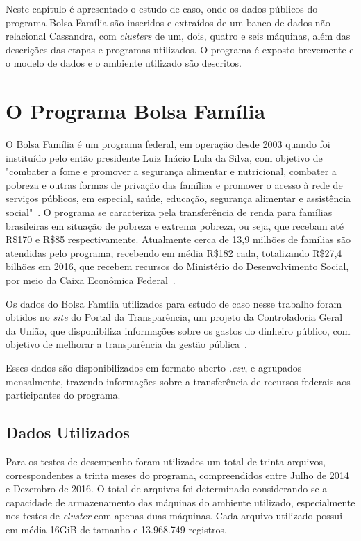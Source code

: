 Neste capítulo é apresentado o estudo de caso, onde os dados públicos do programa Bolsa Família são inseridos e extraídos de um banco de dados não relacional Cassandra, com \emph{clusters} de um, dois, quatro e seis máquinas, além das descrições das etapas e programas utilizados. O programa é exposto brevemente e o modelo de dados e o ambiente utilizado são descritos.

\section{O Programa Bolsa Família}
O Bolsa Família é um programa federal, em operação desde 2003 quando foi instituído pelo então presidente Luiz Inácio Lula da Silva, com objetivo de "combater a fome e promover a segurança alimentar e nutricional, combater a pobreza e outras formas de privação das famílias e promover o acesso à rede de serviços públicos, em especial, saúde, educação, segurança alimentar e assistência social"~\cite{caixa-bolsafamilia}. 
O programa se caracteriza pela transferência de renda para famílias brasileiras em situação de pobreza e extrema pobreza, ou seja, que recebam até R\$170 e R\$85 respectivamente. Atualmente cerca de 13,9 milhões de famílias são atendidas pelo programa, recebendo em média R\$182 cada, totalizando R\$27,4 bilhões em 2016, que recebem recursos do Ministério do Desenvolvimento Social, por meio da Caixa Econômica Federal~\cite{gov-bolsafamilia1, gov-bolsafamilia2}.

Os dados do Bolsa Família utilizados para estudo de caso nesse trabalho foram obtidos no \emph{site} do Portal da Transparência, um projeto da Controladoria Geral da União, que disponibiliza informações sobre os gastos do dinheiro público, com objetivo de melhorar a transparência da gestão pública~\cite{sobreportaldatransparencia}. 

Esses dados são disponibilizados em formato aberto \emph{.csv}, e agrupados mensalmente, trazendo informações sobre a transferência de recursos federais aos participantes do programa. 

\subsection{Dados Utilizados}

Para os testes de desempenho foram utilizados um total de trinta arquivos, correspondentes a trinta meses do programa, compreendidos entre Julho de 2014 e Dezembro de 2016. O total de arquivos foi determinado considerando-se a capacidade de armazenamento das máquinas do ambiente utilizado, especialmente nos testes de \emph{cluster} com apenas duas máquinas. Cada arquivo utilizado possui em média 16GiB de tamanho e 13.968.749 registros.

